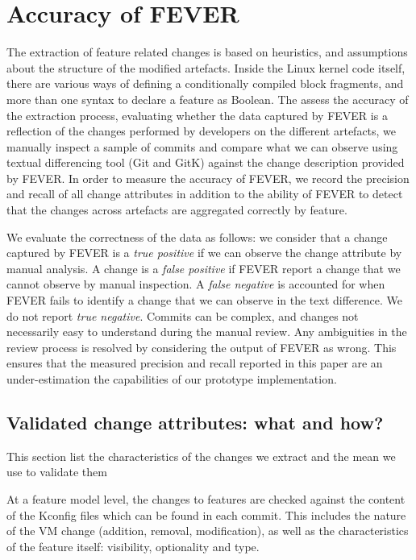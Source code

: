 \section{Accuracy of FEVER}
\label{sec:evaluation}

The extraction of feature related changes is based on heuristics, and assumptions about the structure of the modified artefacts.
Inside the Linux kernel code itself, there are various ways of defining  a conditionally compiled block fragments, 
and more than one syntax to declare a feature as Boolean.
The assess the accuracy of the extraction process, evaluating whether the data captured by FEVER  is a 
reflection of the changes performed by developers on the different artefacts,
we manually inspect a sample of commits and compare what we can observe
using textual differencing tool (Git and GitK) against the change description provided by FEVER.
In order to measure the accuracy of FEVER, we record the precision and recall of all change attributes in addition to 
the ability of FEVER to detect that the changes across artefacts are aggregated correctly by feature.

We evaluate the correctness of the data as follows: 
we consider that a change captured by FEVER is a \textit{true positive} if we can observe the change attribute by manual analysis.
A change is a \textit{false positive} if FEVER report a change that we cannot observe by manual inspection.
A \textit{false negative} is accounted for when FEVER fails to identify a change that we can observe in the text difference.
We do not report \textit{true negative}.
Commits can be complex, and changes not necessarily easy to understand during the manual review.
Any ambiguities in the review process is resolved by considering the output of FEVER as wrong. 
This ensures that the measured precision and recall reported in this paper are an under-estimation the capabilities of 
our prototype implementation.

\subsection{Validated change attributes: what and how?}
This section list the characteristics of the changes we extract and the mean we use to validate them

At a feature model level, the changes to features are checked against the content of the Kconfig files which can be found in each commit.
This includes the nature of the VM change (addition, removal, modification), as well as the characteristics of the feature itself: 
visibility, optionality and type.

